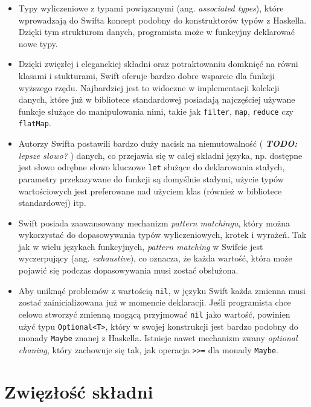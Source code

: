 \documentclass[mgr, shortabstract]{iithesis}
\newcommand{\todo}[1]{
  \textit{\textbf{TODO: }#1}
}
\newcommand{\ang}[1]{ang. \textit{#1}}
\begin{document}
\begin{itemize}
    \item Typy wyliczeniowe z typami powiązanymi (\ang{associated types}), które wprowadzają do Swifta koncept podobny do konstruktorów typów z Haskella. Dzięki tym strukturom danych, programista może w funkcyjny deklarować nowe typy.

    \item Dzięki zwięzłej i eleganckiej składni oraz potraktowaniu domknięć na równi klasami i stukturami, Swift oferuje bardzo dobre wsparcie dla funkcji wyższego rzędu. Najbardziej jest to widoczne w implementacji kolekcji danych, które już w bibliotece standardowej posiadają najczęściej używane funkcje służące do manipulowania nimi, takie jak \texttt{filter}, \texttt{map}, \texttt{reduce} czy \texttt{flatMap}.

    \item Autorzy Swifta postawili bardzo duży nacisk na niemutowalność (\todo{lepsze słowo?}) danych, co przejawia się w całej składni języka, np. dostępne jest słowo odrębne słowo kluczowe \texttt{let} służące do deklarowania stałych, parametry przekazywane do funkcji są domyślnie stałymi, użycie typów wartościowych jest preferowane nad użyciem klas (również w bibliotece standardowej) itp.

    \item Swift posiada zaawansowany mechanizm \textit{pattern matchingu}, który można wykorzystać do dopasowywania typów wyliczeniowych, krotek i wyrażeń. Tak jak w wielu językach funkcyjnych, \textit{pattern matching} w Swifcie jest wyczerpujący (\ang{exhaustive}), co oznacza, że każda wartość, która może pojawić się podczas dopasowywania musi zostać obsłużona.

    \item Aby uniknąć problemów z wartością \texttt{nil}, w języku Swift każda zmienna musi zostać zainicializowana już w momencie deklaracji. Jeśli programista chce celowo stworzyć zmienną mogącą przyjmować \texttt{nil} jako wartość, powinien użyć typu \texttt{Optional<T>}, który w swojej konstrukcji jest bardzo podobny do monady \texttt{Maybe} znanej z Haskella. Istnieje nawet mechanizm zwany \textit{optional chaning}, który zachowuje się tak, jak operacja \texttt{>>=} dla monady \texttt{Maybe}.

\end{itemize}

\section{Zwięzłość składni}
\end{document}

